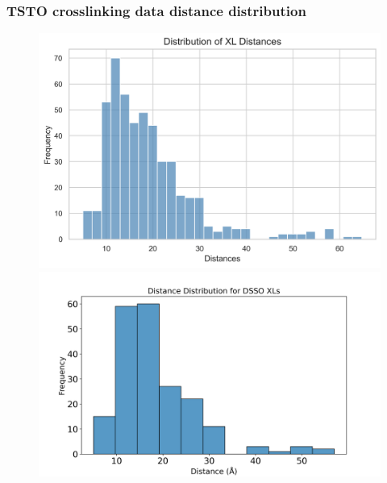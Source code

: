 \documentclass[a4paper,8pt]{beamer}
\begin{document}
\begin{frame}
  \frametitle{TSTO crosslinking data distance distribution}
  \begin{figure}
    \centering
    \includegraphics[scale=0.3]{test-figures/distance_histogram.png}
    \includegraphics[scale=0.2]{test-figures/dsso_distances.png}
  \end{figure}
  \end{frame}
\end{document}

